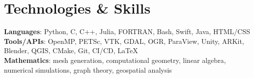 \section{Technologies \& Skills}
 \begin{itemize}[leftmargin=0.15in, label={}]
    \small{\item{
     \textbf{Languages}{: Python, C, C++, Julia, FORTRAN, Bash, Swift, Java, HTML/CSS} \\
     \textbf{Tools/APIs}{: OpenMP, PETSc, VTK, GDAL, OGR, ParaView, Unity, ARKit, Blender, QGIS, CMake, Git, CI/CD, \LaTeX} \\
     \textbf{Mathematics}{: mesh generation, computational geometry, linear algebra, numerical simulations, graph theory, geospatial analysis}
    }}
 \end{itemize}
